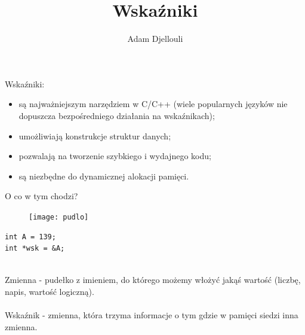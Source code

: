 \documentclass[notheorems, aspectratio=54]{beamer}
\title[Wskaźniki]{Wskaźniki}
\author{Adam Djellouli}
\begin{document}
\begin{frame}
    \titlepage
\end{frame}

\begin{frame}
Wskaźniki:
\begin{itemize}
\item są najważniejszym narzędziem w C/C++ (wiele popularnych języków nie dopuszcza bezpośredniego działania na wskaźnikach);
\item umożliwiają konstrukcje struktur danych;
\item pozwalają na tworzenie szybkiego i wydajnego kodu;
\item są niezbędne do dynamicznej alokacji pamięci.
\end{itemize}

\end{frame}

\begin{frame}[fragile]
O co w tym chodzi?
\center
\begin{table}[!htb]
\begin{minipage}{.5\linewidth}
\begin{figure}

  \texttt{[image: pudlo]}
\end{figure}
\end{minipage}%
\begin{minipage}{.5\linewidth}

\begin{lstlisting}
int A = 139;
int *wsk = &A;
\end{lstlisting}
~\\
Zmienna - pudełko z imieniem, do którego możemy włożyć jakąś wartość (liczbę, napis, wartość logiczną).\\~\\
Wskaźnik - zmienna, która trzyma informacje o tym gdzie w pamięci siedzi inna zmienna.

\end{minipage} 
\end{table}

\end{frame}
\end{document}
